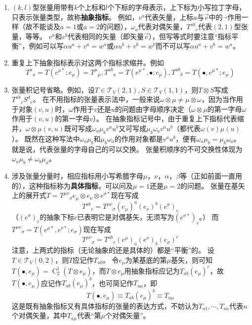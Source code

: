 \begin{enumerate}[1.]
\item $(k, l)$型张量用带有$k$个上标和$l$个下标的字母表示，上下标为小写拉丁字母，只表示张量类型，故称\textbf{抽象指标}。
例如，$v^a$代表矢量，上标$a$与$\vec{v}$中的$\vec{}$作用一样（故不能谈及$a = 1$或$a = 2$的问题），$\omega_a$代表对偶矢量，$T^{ab}{}_c$代表$(2, 1)$型张量，等等。
$v^a$和$v^b$代表相同的矢量（即矢量$\vec{v}$），但写等式时要注意``指标平衡''，例如可以写$\alpha u^a + v^a = w^a$或$\alpha u^b + v^b = w^b$而不可以写$\alpha u^a + v^b = w^a$。
\item 重复上下抽象指标表示对这两个指标求缩并。例如
$$T^a{}_a = T(e^{\mu*}; e_\mu) = T^\mu{}_\mu, T^{ab}{}_a = T(e^{\mu*}, \bullet; e_\mu), T^{ab}{}_b = T(\bullet, e^{\mu*}; e_\mu)$$
\item 张量积记号省略。例如，设$T \in \mathscr{T}_V(2, 1), S \in \mathscr{T}_V(1, 1)$，则$T \otimes S$写成$T^{ab}{}_cS^d{}_e$。
在不用指标的张量表示法中，一般来说$\omega \otimes \mu \neq \mu \otimes \omega$，因为当作用于对象$(v, u)$时，$\omega$作用于$v$还是$u$的问题由字母顺序决定（$\omega \otimes \mu$的第一字母$\omega$作用于$(v, u)$的第一字母$v$）。
在抽象指标记号中，由于重复上下指标代表缩并，$\omega \otimes \mu(v, u)$既可写成$\omega_a\mu_bv^au^b$又可写成$\mu_b\omega_av^au^b$（都代表$\omega(v)\mu(u)$）。
既然在这种写法中$\omega_a\mu_b$和$\mu_b\omega_a$的作用对象都是$v^au^b$，便有$\omega_a\mu_b = \mu_b\omega_a$。
就是说，代表张量的字母自己的可以交换。
张量积顺序的不可交换性体现为$\omega_a\mu_b \neq \omega_b\mu_a$。
\item 涉及张量分量时，相应指标用小写希腊字母$\mu$，$\nu$，$\alpha$，$\beta$等（正如前面一直用的），这种指标称为\textbf{具体指标}，可以问及$\mu = 1$还是$\mu = 2$的问题。
张量在基矢上的展开式$T = T^{\mu\nu}{}_\sigma e_\mu \otimes e_\nu \otimes e^{\sigma*}$现在写成
$$T^{ab}{}_c = T^{\mu\nu}{}_\sigma(e_\mu)^a(e_\nu)^b(e^\sigma)_c$$（$(e^\sigma)_c$的抽象下标$c$已表明它是对偶基矢，无须写为$(e^{\sigma*})_c$。）
而$T^{\mu\nu}{}_\sigma = T(e^{\mu*}, e^{\nu*}; e_\sigma)$现在写成
$$T^{\mu\nu}{}_\sigma = T^{ab}{}_c(e^\mu)_a(e^\nu)_b(e_\sigma)^c$$
注意，上两式的指标（无论抽象的还是具体的）都是``平衡''的。
设$T \in \mathscr{T}_V(0, 2)$，则$T$应记作$T_{ab}$。
令$e_\mu$为某基底的第$\mu$基矢，则可知$T(\bullet, e_\mu) = \operatorname{C}^1_2(T \otimes e_\mu)$，而$T \otimes e_\mu$用抽象指标应记为$T_{ab}(e_\mu)^c$，故$T(\bullet, e_\mu)$应记作$T_{ab}(e_\mu)^b$，也可简记作$T_{a\mu}$，即
$$T(\bullet, e_\mu) \equiv T_{ab}(e_\mu)^b \equiv T_{a\mu}$$
这是既有抽象指标又有具体指标的张量的表达方式，不妨认为$T_{a1}, \cdots, T_{an}$代表$n$个对偶矢量，其中$T_{a\mu}$代表``第$\mu$个对偶矢量''。

\end{enumerate}
